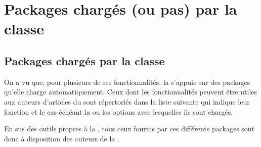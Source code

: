 \documentclass[french,nolocaltoc]{nwejmart}
\newtheorem[style=definition]{fait}
\newtheorem[title=expérience]{experience}
\newtheorem[title-plural=anneaux]{anneau}
\newtheorem[title=idéal,title-plural=idéaux]{ideal}
\begin{document}
\section{Packages chargés (ou pas) par la
  classe}\label{sec-packages-charges-ou-pas}

\subsection{Packages chargés par la classe}\label{sec:packages-charges-par}

On a vu que, pour plusieurs de ses fonctionnalités, la \nwejmauthorcl{} s'appuie
sur des packages qu'elle charge automatiquement. Ceux dont les fonctionnalités
peuvent être utiles aux auteurs d'articles du \nwejm{} sont répertoriés dans la
liste suivante qui indique leur fonction et le cas échéant la ou les options
avec lesquelles ils sont chargés.

En sus des outils propres à la \nwejmauthorcl, tous ceux fournis par ces
différents packages sont donc à disposition des auteurs de la \nwejm{}.
\end{document}

